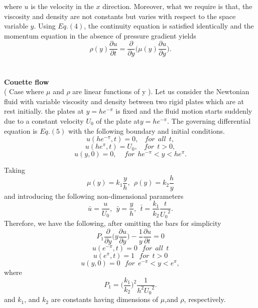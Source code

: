 \documentclass[10pt]{beamer}
\begin{document}
		\begin{frame}
		where $ u $ is the velocity in the $ x $ direction. Moreover, what we require is that, the viscosity and density are not constants but varies with respect to the space variable $ y $. Using $ Eq. (4) $, the continuity equation is satisfied identically and the momentum equation in the absence of pressure gradient yields
		\begin{equation}
		\rho (y) \frac{\partial u}{\partial t} = \frac{\partial}{\partial y} \bigg( \mu (y) \frac{\partial u}{\partial y} \bigg).
		\end{equation}\\~\\
		
		\textbf{Couette flow}\\
		( Case where $ \mu $ and $ \rho $ are linear functions of y ). Let us consider the Newtonian fluid with variable viscosity and density between two rigid plates which are at rest initially. the plates at $ y = h e^{-\pi} $ is fixed and the fluid motion starts suddenly due to a constant velocity $ U_0 $ of the plate at$ y = he^{-\pi} $. The governing differential equation is $ Eq. (5) $ with the following boundary and initial conditions.\\
		$$u ( he^{-\pi}, t ) = 0, ~~~~ for~~ all ~~ t,$$
		\begin{equation}
		u ( he^{\pi}, t ) = U_0, ~~~~for ~~t > 0,
		\end{equation}
		$$u ( y, 0 ) = 0,~~~~~ for~~ h e^{-\pi} < y < h e^{\pi}.$$
		\end{frame}
		
		\begin{frame}
		Taking
		\begin{equation}
		\mu(y) = k_1 \frac{y}{h}, ~~ \rho(y) = k_2 \frac{h}{y}
		\end{equation}
		and introducing the following non-dimensional parameters
		\begin{equation}
		\bar{u} = \frac{u}{U_0},~~ \bar{y} = \frac{y}{h},~~ \bar{t} = \frac{k_1}{k_2} \frac{t}{{U_0}^2}.
		\end{equation}
		Therefore, we have the following, after omitting the bars for simplicity
		\begin{equation}
		 P_1 \frac{\partial}{\partial y} \bigg( y \frac{\partial u}{\partial y} \bigg) - \frac{1}{y} \frac{\partial u}{\partial t} = 0
		\end{equation}
		$$ u ( e^{-\pi}, t ) = 0 ~~~ for ~~ all ~~ t $$
		$$ u ( e^\pi, t ) = 1 ~~~ for ~~ t > 0 $$
		\begin{equation}
		u ( y, 0 ) = 0 ~~~ for ~~ e^{-\pi} < y < e^\pi,
		\end{equation}
		where
		\begin{equation}
		P_1 = \bigg(\frac{k_1}{k_2} \bigg)^2 \frac{1}{h^2 {U_0}^2}.
		\end{equation}
		and $ k_1 $, and $ k_2 $ are constants having dimensions of $ \mu $,and $ \rho $, respectively.
		
		\end{frame}
		
\end{document}
